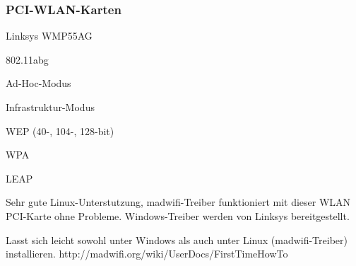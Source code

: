 \subsubsection{PCI-WLAN-Karten}

%
%
\begin{wlandevice}{Linksys WMP55AG}



\begin{wlanieeestandard}
\item 802.11abg
\end{wlanieeestandard}

\begin{wlanmode}
\item Ad-Hoc-Modus
\item Infrastruktur-Modus
\end{wlanmode}

\begin{wlansecurity}
\item WEP (40-, 104-, 128-bit)
\item WPA
\item LEAP
\end{wlansecurity}

\begin{wlandriver}
\item
Sehr gute Linux-Unterstutzung, madwifi-Treiber funktioniert
mit dieser WLAN PCI-Karte ohne Probleme.
Windows-Treiber werden von Linksys bereitgestellt.
\end{wlandriver}


\begin{wlaninstall}
\item
Lasst sich leicht sowohl unter Windows als auch unter Linux (madwifi-Treiber) installieren.
http://madwifi.org/wiki/UserDocs/FirstTimeHowTo
\end{wlaninstall}

\end{wlandevice}

